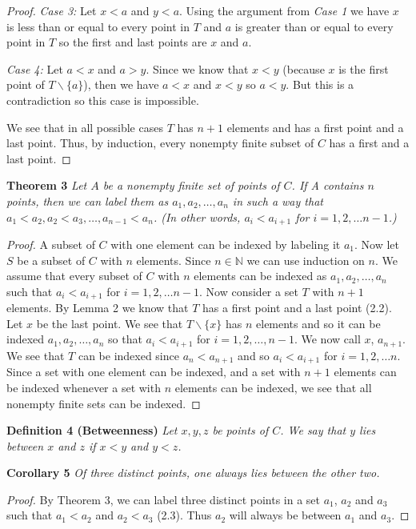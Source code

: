 \documentclass{article}
\begin{document}
\begin{flushleft}
\begin{proof}
\textsl{Case 3:} Let $x<a$ and $y<a$. Using the argument from \textit{Case 1} we have $x$ is less than or equal to every point in $T$ and $a$ is greater than or equal to every point in $T$ so the first and last points are $x$ and $a$.\newline

\textsl{Case 4:} Let $a<x$ and $a>y$. Since we know that $x<y$ (because $x$ is the first point of $T \backslash \{a\}$), then we have $a<x$ and $x<y$ so $a<y$. But this is a contradiction so this case is impossible.\newline

We see that in all possible cases $T$ has $n+1$ elements and has a first point and a last point. Thus, by induction, every nonempty finite subset of $C$ has a first and a last point.
\end{proof}

\textbf{Theorem 3}
\textsl{Let $A$ be a nonempty finite set of points of $C$. If A contains $n$ points, then we can label them as $a_1, a_2, \dots , a_n$ in such a way that $a_1 < a_2,  a_2 < a_3, \dots ,a_{n-1} < a_n$. (In other words, $a_i < a_{i+1}$ for $i = 1,2, \dots n - 1$.)}
\begin{proof}
A subset of $C$ with one element can be indexed by labeling it $a_1$. Now let $S$ be a subset of $C$ with $n$ elements. Since $n \in \mathbb{N}$ we can use induction on $n$. We assume that every subset of $C$ with $n$ elements can be indexed as $a_1,a_2, \dots ,a_n$ such that $a_i<a_{i+1}$ for $i=1,2,\dots n-1$. Now consider a set $T$ with $n+1$ elements. By Lemma 2 we know that $T$ has a first point and a last point (2.2). Let $x$ be the last point. We see that $T\backslash \{x\}$ has $n$ elements and so it can be indexed $a_1,a_2, \dots ,a_n$ so that $a_i<a_{i+1}$ for $i=1,2,\dots ,n-1$. We now call $x$, $a_{n+1}$. We see that $T$ can be indexed since $a_n<a_{n+1}$ and so $a_i<a_{i+1}$ for $i=1,2, \dots n$. Since a set with one element can be indexed, and a set with $n+1$ elements can be indexed whenever a set with $n$ elements can be indexed, we see that all nonempty finite sets can be indexed.
\end{proof}

\textbf{Definition 4 (Betweenness)}
\textsl{Let $x,y,z$ be points of $C$. We say that $y$ lies between $x$ and $z$ if $x<y$ and $y<z$.}\newline

\textbf{Corollary 5}
\textsl{Of three distinct points, one always lies between the other two.}
\begin{proof}
By Theorem 3, we can label three distinct points in a set $a_1$, $a_2$ and $a_3$ such that $a_1 < a_2$ and $a_2 < a_3$ (2.3). Thus $a_2$ will always be between $a_1$ and $a_3$.
\end{proof}


\end{flushleft}
\end{document}
